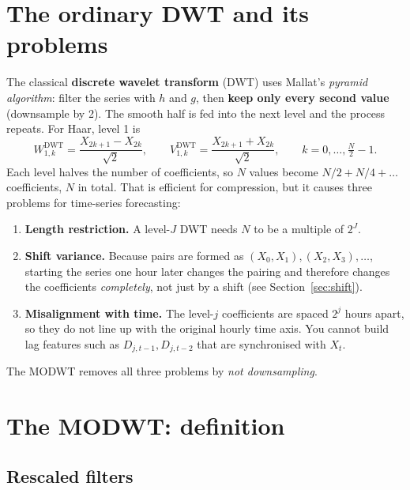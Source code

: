 \documentclass[11pt,a4paper]{article}
\begin{document}
\section{The ordinary DWT and its problems}

The classical \textbf{discrete wavelet transform} (DWT) uses Mallat's \emph{pyramid algorithm}:
filter the series with $h$ and $g$, then \textbf{keep only every second value} (downsample by 2). The
smooth half is fed into the next level and the process repeats. For Haar, level 1 is
\[
  W^{\text{DWT}}_{1,k} = \frac{X_{2k+1}-X_{2k}}{\sqrt2},\qquad
  V^{\text{DWT}}_{1,k} = \frac{X_{2k+1}+X_{2k}}{\sqrt2},\qquad k=0,\dots,\tfrac N2 - 1 .
\]
Each level halves the number of coefficients, so $N$ values become $N/2+N/4+\dots$ coefficients, $N$ in total.
That is efficient for compression, but it causes three problems for time-series forecasting:

\begin{enumerate}[leftmargin=1.5em]
  \item \textbf{Length restriction.} A level-$J$ DWT needs $N$ to be a multiple of $2^J$.
  \item \textbf{Shift variance.} Because pairs are formed as $(X_0,X_1),(X_2,X_3),\dots$, starting the series one
        hour later changes the pairing and therefore changes the coefficients \emph{completely},
        not just by a shift (see Section~\ref{sec:shift}).
  \item \textbf{Misalignment with time.} The level-$j$ coefficients are spaced $2^j$ hours apart, so they do not line up
        with the original hourly time axis. You cannot build lag features such as $D_{j,t-1}, D_{j,t-2}$ that are
        synchronised with $X_t$.
\end{enumerate}

The MODWT removes all three problems by \emph{not downsampling}.

\section{The MODWT: definition}

\subsection{Rescaled filters}
\end{document}
